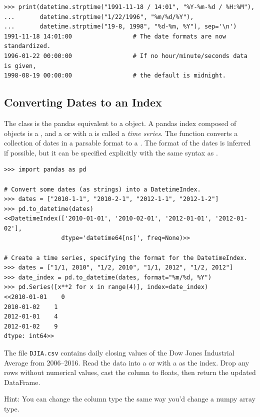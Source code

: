 \begin{lstlisting}
>>> print(datetime.strptime("1991-11-18 / 14:01", "%Y-%m-%d / %H:%M"),
...       datetime.strptime("1/22/1996", "%m/%d/%Y"),
...       datetime.strptime("19-8, 1998", "%d-%m, %Y"), sep='\n')
1991-11-18 14:01:00                 # The date formats are now standardized.
1996-01-22 00:00:00                 # If no hour/minute/seconds data is given,
1998-08-19 00:00:00                 # the default is midnight.
\end{lstlisting}

\subsection*{Converting Dates to an Index} %

The  class is the pandas equivalent to a  object.
A pandas index composed of  objects is a , and a  or  with a  is called a \emph{time series}.
The function  converts a collection of dates in a parsable format to a .
The format of the dates is inferred if possible, but it can be specified explicitly with the same syntax as .

\begin{lstlisting}
>>> import pandas as pd

# Convert some dates (as strings) into a DatetimeIndex.
>>> dates = ["2010-1-1", "2010-2-1", "2012-1-1", "2012-1-2"]
>>> pd.to_datetime(dates)
<<DatetimeIndex(['2010-01-01', '2010-02-01', '2012-01-01', '2012-01-02'],
                dtype='datetime64[ns]', freq=None)>>

# Create a time series, specifying the format for the DatetimeIndex.
>>> dates = ["1/1, 2010", "1/2, 2010", "1/1, 2012", "1/2, 2012"]
>>> date_index = pd.to_datetime(dates, format="%m/%d, %Y")
>>> pd.Series([x**2 for x in range(4)], index=date_index)
<<2010-01-01    0
2010-01-02    1
2012-01-01    4
2012-01-02    9
dtype: int64>>
\end{lstlisting}

\begin{problem} %
The file \texttt{DJIA.csv} contains daily closing values of the Dow Jones Industrial Average from 2006--2016.
Read the data into a  or  with a  as the index.
Drop any rows without numerical values, cast the  column to floats, then return the updated DataFrame.

Hint: You can change the column type the same way you'd change a numpy array type.
\label{prob:timeseries-dowjones}
\end{problem}

